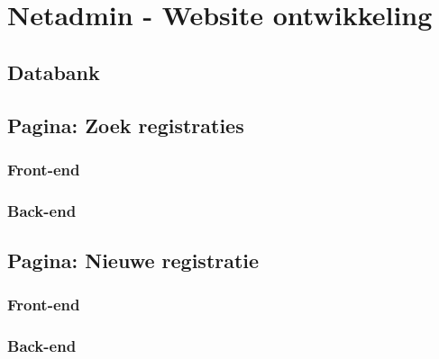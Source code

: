 
\chapter{Netadmin - Website ontwikkeling}%
\label{ch:netadmin-website-ontwikkeling}

\section{Databank}
\label{databank}

\section{Pagina: Zoek registraties}
\label{zoek-registraties}
\subsection{Front-end}
\subsection{Back-end}


\section{Pagina: Nieuwe registratie}
\label{nieuwe-registratie}
\subsection{Front-end}
\subsection{Back-end}

